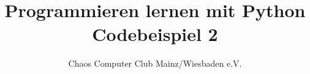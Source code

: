 



	\title{Programmieren lernen mit Python\\Codebeispiel 2}
	\author{Chaos Computer Club Mainz/Wiesbaden e.V.}
	\maketitle
	
	\section*{}
	
	\lstset{numbers=left}
	
	
